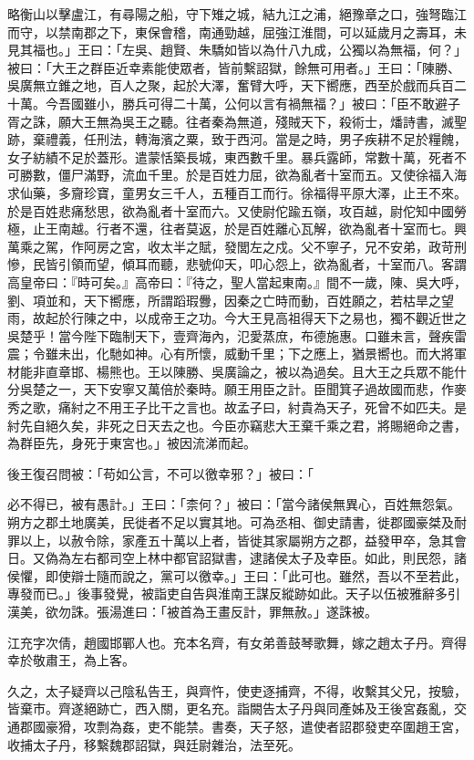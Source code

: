 \begin{pinyinscope}
略衡山以擊盧江，有尋陽之船，守下雉之城，結九江之浦，絕豫章之口，強弩臨江而守，以禁南郡之下，東保會稽，南通勁越，屈強江淮間，可以延歲月之壽耳，未見其福也。」王曰：「左吳、趙賢、朱驕如皆以為什八九成，公獨以為無福，何？」被曰：「大王之群臣近幸素能使眾者，皆前繫詔獄，餘無可用者。」王曰：「陳勝、吳廣無立錐之地，百人之聚，起於大澤，奮臂大呼，天下嚮應，西至於戲而兵百二十萬。今吾國雖小，勝兵可得二十萬，公何以言有禍無福？」被曰：「臣不敢避子胥之誅，願大王無為吳王之聽。往者秦為無道，殘賊天下，殺術士，燔詩書，滅聖跡，棄禮義，任刑法，轉海濱之粟，致于西河。當是之時，男子疾耕不足於糧餽，女子紡績不足於蓋形。遣蒙恬築長城，東西數千里。暴兵露師，常數十萬，死者不可勝數，僵尸滿野，流血千里。於是百姓力屈，欲為亂者十室而五。又使徐福入海求仙藥，多齎珍寶，童男女三千人，五種百工而行。徐福得平原大澤，止王不來。於是百姓悲痛愁思，欲為亂者十室而六。又使尉佗踰五嶺，攻百越，尉佗知中國勞極，止王南越。行者不還，往者莫返，於是百姓離心瓦解，欲為亂者十室而七。興萬乘之駕，作阿房之宮，收太半之賦，發閭左之戍。父不寧子，兄不安弟，政苛刑慘，民皆引領而望，傾耳而聽，悲號仰天，叩心怨上，欲為亂者，十室而八。客謂高皇帝曰：『時可矣。』高帝曰：『待之，聖人當起東南。』間不一歲，陳、吳大呼，劉、項並和，天下嚮應，所謂蹈瑕釁，因秦之亡時而動，百姓願之，若枯旱之望雨，故起於行陳之中，以成帝王之功。今大王見高祖得天下之易也，獨不觀近世之吳楚乎！當今陛下臨制天下，壹齊海內，氾愛蒸庶，布德施惠。口雖未言，聲疾雷震；令雖未出，化馳如神。心有所懷，威動千里；下之應上，猶景嚮也。而大將軍材能非直章邯、楊熊也。王以陳勝、吳廣論之，被以為過矣。且大王之兵眾不能什分吳楚之一，天下安寧又萬倍於秦時。願王用臣之計。臣聞箕子過故國而悲，作麥秀之歌，痛紂之不用王子比干之言也。故孟子曰，紂貴為天子，死曾不如匹夫。是紂先自絕久矣，非死之日天去之也。今臣亦竊悲大王棄千乘之君，將賜絕命之書，為群臣先，身死于東宮也。」被因流涕而起。

後王復召問被：「苟如公言，不可以徼幸邪？」被曰：「

必不得已，被有愚計。」王曰：「柰何？」被曰：「當今諸侯無異心，百姓無怨氣。朔方之郡土地廣美，民徙者不足以實其地。可為丞相、御史請書，徙郡國豪桀及耐罪以上，以赦令除，家產五十萬以上者，皆徙其家屬朔方之郡，益發甲卒，急其會日。又偽為左右都司空上林中都官詔獄書，逮諸侯太子及幸臣。如此，則民怨，諸侯懼，即使辯士隨而說之，黨可以徼幸。」王曰：「此可也。雖然，吾以不至若此，專發而已。」後事發覺，被詣吏自告與淮南王謀反縱跡如此。天子以伍被雅辭多引漢美，欲勿誅。張湯進曰：「被首為王畫反計，罪無赦。」遂誅被。

江充字次倩，趙國邯鄲人也。充本名齊，有女弟善鼓琴歌舞，嫁之趙太子丹。齊得幸於敬肅王，為上客。

久之，太子疑齊以己陰私告王，與齊忤，使吏逐捕齊，不得，收繫其父兄，按驗，皆棄市。齊遂絕跡亡，西入關，更名充。詣闕告太子丹與同產姊及王後宮姦亂，交通郡國豪猾，攻剽為姦，吏不能禁。書奏，天子怒，遣使者詔郡發吏卒圍趙王宮，收捕太子丹，移繫魏郡詔獄，與廷尉雜治，法至死。


\end{pinyinscope}
